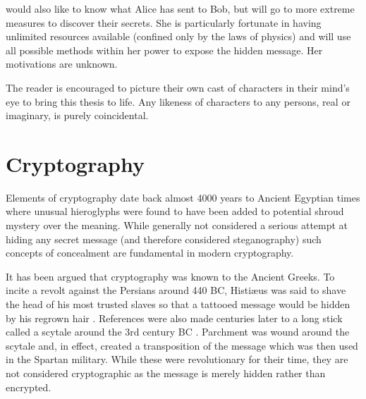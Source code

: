  would also like to know what Alice has sent to Bob, but will go to more extreme measures to discover their secrets. She is particularly fortunate in having unlimited resources available (confined only by the laws of physics) and will use all possible methods within her power to expose the hidden message. Her motivations are unknown.

The reader is encouraged to picture their own cast of characters in their mind's eye to bring this thesis to life. Any likeness of characters to any persons, real or imaginary, is purely coincidental.

\section{Cryptography}
\label{sec1:crypto}

Elements of cryptography date back almost 4000 years to Ancient Egyptian times where unusual hieroglyphs were found to have been added to potential shroud mystery over the meaning\cite{singh1999code}. While generally not considered a serious attempt at hiding any secret message (and therefore considered steganography) such concepts of concealment are fundamental in modern cryptography.

It has been argued that cryptography was known to the Ancient Greeks. To incite a revolt against the Persians around 440 BC, Histi{\ae}us was said to shave the head of his most trusted slaves so that a tattooed message would be hidden by his regrown hair \cite{Herodotus}. References were also made centuries later to a long stick called a scytale around the 3rd century BC \cite{Deipnosophistae}. Parchment was wound around the scytale and, in effect, created a transposition of the message which was then used in the Spartan military. While these were revolutionary for their time, they are not considered cryptographic as the message is merely hidden rather than encrypted.





